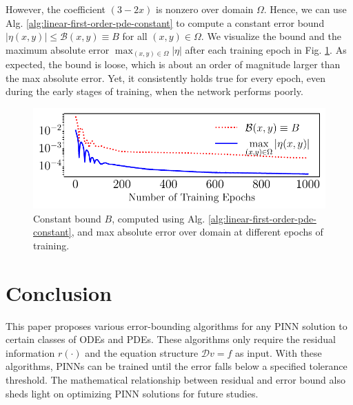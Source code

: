 \documentclass{uai2023}
\newcommand{\Err}{\eta}
\newcommand{\Bound}{\mathcal{B}}
\begin{document}
    However, the coefficient $(3-2x)$ is nonzero over domain $\Omega$.
    Hence, we can use Alg. \ref{alg:linear-first-order-pde-constant} to compute a constant error bound $|\eta(x, y)| \leq \Bound(x, y) \equiv B$ for all $(x, y) \in \Omega$.
    We visualize the bound and the maximum absolute error $\max_{(x, y)\in\Omega}|\Err|$ after each training epoch in Fig. \ref{fig:pde-constant-bound}.
    As expected, the bound is loose, which is about an order of magnitude larger than the max absolute error.
    Yet, it consistently holds true for every epoch, even during the early stages of training, when the network performs poorly.
    \begin{figure}[!ht]
        \centering
        \includegraphics[width=\linewidth]{assets/pde-constant-bound.pdf}
        \caption{
            \small
            Constant bound $B$, computed using Alg. \ref{alg:linear-first-order-pde-constant}, and max absolute error over domain at different epochs of training.
        }\label{fig:pde-constant-bound}
    \end{figure}

\section{Conclusion}
    This paper proposes various error-bounding algorithms for any PINN solution to certain classes of ODEs and PDEs. 
    These algorithms only require the residual information $r(\cdot)$ and the equation structure $\mathcal{D} v = f$ as input.
    With these algorithms, PINNs can be trained until the error falls below a specified tolerance threshold.
    The mathematical relationship between residual and error bound also sheds light on optimizing PINN solutions for future studies.


\end{document}

